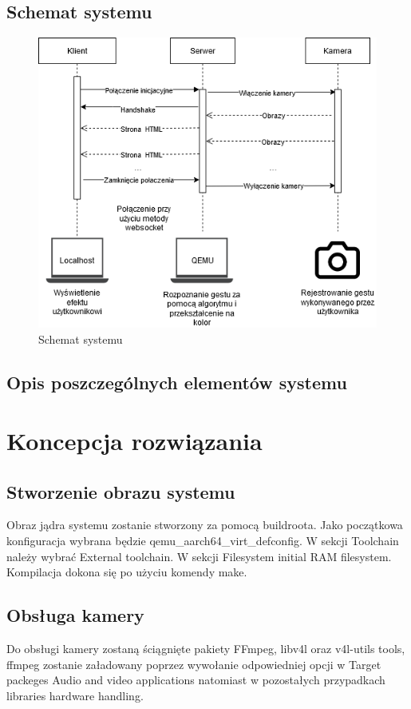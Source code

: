 \documentclass{article}
\begin{document}
\subsection{Schemat systemu}
\begin{figure}[H]
  \centering  
  \includegraphics[width=0.8\linewidth]{sequence.png}
  \caption{Schemat systemu}
\end{figure}   
\subsection{Opis poszczególnych elementów systemu}
\section{Koncepcja rozwiązania}
\subsection{Stworzenie obrazu systemu}
Obraz jądra systemu zostanie stworzony za pomocą buildroota. Jako początkowa konfiguracja wybrana będzie qemu\_aarch64\_virt\_defconfig. W sekcji Toolchain należy wybrać External toolchain. W sekcji Filesystem initial RAM filesystem. Kompilacja dokona się po użyciu komendy make.
\subsection{Obsługa kamery}
Do obsługi kamery zostaną ściągnięte pakiety FFmpeg, libv4l oraz v4l-utils tools, ffmpeg zostanie załadowany poprzez wywołanie odpowiedniej opcji w Target packeges  Audio and video applications natomiast w pozostałych przypadkach libraries hardware handling.
\end{document}
